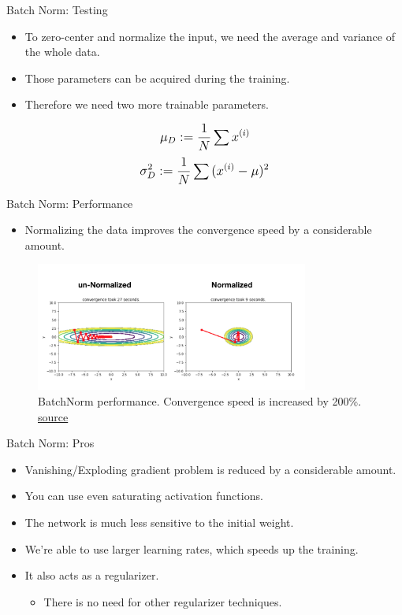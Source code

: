 \begin{frame}{Batch Norm: Testing}
	\begin{itemize}
		\item To zero-center and normalize the input, we need the average and variance of the whole data.
		\medskip
		\item Those parameters can be acquired during the training.
		\medskip
		\item Therefore we need two more trainable parameters.
	\end{itemize}
	\vspace{0.1\textheight}
		\begin{equation*}
			\mathlarger{
				\mu_D := \frac{1}{N} \sum{x^{(i)}}
			}
		\end{equation*}
		\begin{equation*}
			\mathlarger{
				\sigma_D^2 := \frac{1}{N} \sum{(x^{(i)} - \mu)^2}
			}
		\end{equation*}
\end{frame}
\begin{frame}{Batch Norm: Performance}
	\begin{itemize}
		\item Normalizing the data improves the convergence speed by a considerable amount.
	\end{itemize}
	\begin{figure}[H]
		\centering
		\includegraphics[width=0.8\textwidth]{Figs/section_4/batchnorm_3.png}
		\caption{BatchNorm performance. Convergence speed is increased by 200\%.  \href{https://jsideas.net/batch_normalization/}{source}}
	\end{figure}
\end{frame}
\begin{frame}{Batch Norm: Pros}
	\begin{itemize}
		\item Vanishing/Exploding gradient problem is reduced by a considerable amount.
		\medskip
			\item You can use even saturating activation functions.
			\medskip
			\item The network is much less sensitive to the initial weight.
			\medskip
			\item We're able to use larger learning rates, which speeds up the training.
		\medskip
		\item It also acts as a regularizer.
		\medskip
		\begin{itemize}
			\item There is no need for other regularizer techniques.
		\end{itemize}
	\end{itemize}
\end{frame}
